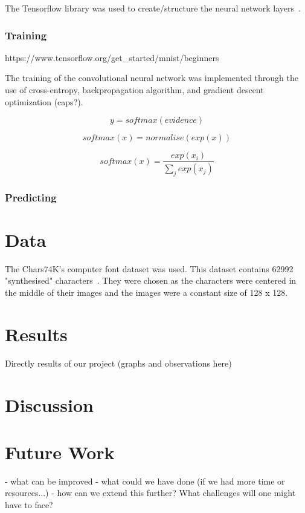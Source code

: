 \documentclass[11pt]{article}
\begin{document}
The Tensorflow library was used to create/structure the neural network layers~\cite{tensorflow15-whitepaper}.


\subsubsection{Training}
https://www.tensorflow.org/get_started/mnist/beginners

The training of the convolutional neural network was implemented through the use of cross-entropy, backpropagation algorithm, and gradient descent optimization (caps?).



\begin{equation}
    y = softmax(evidence)    
\end{equation}

\begin{equation}
    softmax(x) = normalise(exp(x))
\end{equation}

\begin{equation}
    softmax(x) = \frac{exp(x_{i})}{\sum_{j} exp(x_{j})}
\end{equation}


\subsubsection{Predicting}

\section{Data}
The Chars74K's computer font dataset was used. This dataset contains 62992 "synthesised" characters~\cite{deCampos09}. They were chosen as the characters were centered in the middle of their images and the images were a constant size of 128 x 128.

\section{Results}
Directly results of our project (graphs and observations here)

\section{Discussion}


\section{Future Work}
- what can be improved
- what could we have done (if we had more time or resources...)
- how can we extend this further? What challenges will one might have to face?
\end{document}
